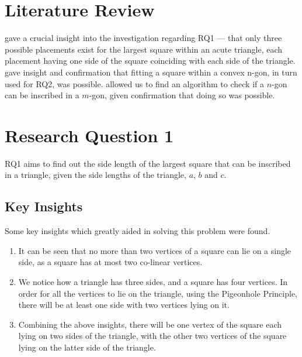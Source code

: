\documentclass[12pt]{scrartcl}
\begin{document}
\section{Literature Review}
\cite{tbtb1} gave a crucial insight into the investigation regarding RQ1 — that only three possible placements exist for the largest square within an acute triangle, each placement having one side of the square coinciding with each side of the triangle.
\cite{chazelle} gave insight and confirmation that fitting a square within a convex n-gon, in turn used for RQ2, was possible.
\cite{dilworth} allowed us to find an algorithm to check if a $n$-gon can be inscribed in a $m$-gon, given confirmation that doing so was possible.

\pagebreak

\section{Research Question 1}

RQ1 aims to find out the side length of the largest square that can be inscribed in a triangle,
given the side lengths of the triangle, $a$, $b$ and $c$.

\subsection{Key Insights}
Some key insights which greatly aided in solving this problem were found.
\begin{enumerate}
	\item It can be seen that no more than two vertices of a square can lie on a single side,
	      as a square has at most two co-linear vertices.
	\item We notice how a triangle has three sides, and a square has four vertices.
	      In order for all the vertices to lie on the triangle, using the Pigeonhole Principle,
	      there will be at least one side with two vertices lying on it.
	\item Combining the above insights, there will be one vertex of the square
	      each lying on two sides of the triangle, with the other two vertices of the square
	      lying on the latter side of the triangle.
\end{enumerate}
\end{document}
